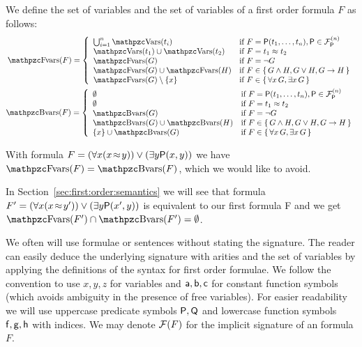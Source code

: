 \begin{definition}\label{def:fof:fvars}\label{def:fof:bvars}
	We define the set of  variables and the set of  variables
	of a first order formula \( F \) as follows:
\begin{gather*}
	\MDEFINE{\fvar(F)}{ll}{
		\bigcup_{i=1}^n \var(t_i)
		&\text{if }F
		= \mP(t_1,\ldots,t_n), \mP\in\mcFPn
		\\
		\var(t_1)\cup\var(t_2)
		&\text{if }F
		= t_1\mEQ t_2
		\\
		\fvar(G)&\text{if }F = \lnot G
		\\
		\fvar(G) \cup \fvar(H)&\text{if }F \in \{ \, G\land H,G \lor H,G\limp H \, \}
		\\
		\fvar (G) \setminus \{ x\} &\text{if } F \in \{ \, \forall x \, G, \exists x \, G \, \}
	}
	\\
\MDEFINE{\bvar(F)}{ll}{
	\emptyset &\text{if }F = \mP(t_1,\ldots,t_n), \mP\in\mcFPn
	\\
	\emptyset &\text{if }F = t_1\mEQ t_2
	\\
	\bvar(G)&\text{if }F = \lnot G
	\\
	\bvar(G) \cup \bvar(H)&\text{if }F \in \{ \, G \land H, G \lor H, G \limp H \, \}
	\\
	\{ x\} \cup \bvar (G) &\text{if } F \in \{ \, \forall x \, G, \exists x\,G \, \}
}
\end{gather*}
\end{definition}

\begin{example}
	With formula \( F = (\forall x (x\!\approx\!y)) \lor (\exists y \mathsf{P}(x,y)) \)
	we have \( \fvar(F) = \bvar(F) \), which we would like to avoid.

	In Section~\vref{sec:first:order:semantics} we will see that formula
	\( F' = (\forall x (x\!\approx\!y')) \lor (\exists y \mathsf{P}(x',y)) \)
	is equivalent to our first formula F
	and we get
	\( \fvar(F') \cap \bvar(F') = \emptyset \).
\end{example}
We often will use formulae or sentences
without stating the signature.
The reader can easily deduce the underlying  signature with arities
and the set of variables by applying the definitions of the syntax for first order formulae.
We follow the convention to use \( x,y,z \) for variables
and \( \mathsf{a},\mathsf{b},\mathsf{c} \) for constant function symbols
(which avoids ambiguity in the presence of free variables).
For easier readability we will use
uppercase predicate symbols \(\mathsf{P},\mathsf{Q} \) and
lowercase function symbols \( \mathsf{f},\mathsf{g},\mathsf{h} \) with indices.
We may denote \( \mathcal{F}(F) \) for the implicit signature of an formula \( F \).

